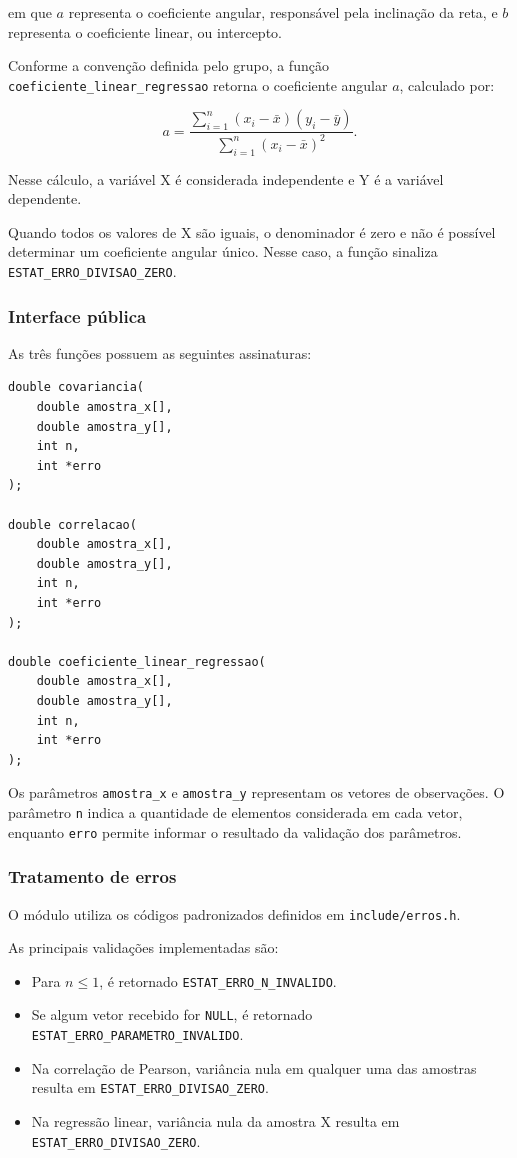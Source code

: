 \documentclass[12pt,a4paper]{article}
\newcommand{\cod}[1]{\texttt{#1}}
\begin{document}
em que $a$ representa o coeficiente angular, responsável pela inclinação
da reta, e $b$ representa o coeficiente linear, ou intercepto.

Conforme a convenção definida pelo grupo, a função
\cod{coeficiente\_linear\_regressao} retorna o coeficiente angular $a$,
calculado por:

\begin{equation}
a =
\frac{
\sum_{i=1}^{n}(x_i-\bar{x})(y_i-\bar{y})
}{
\sum_{i=1}^{n}(x_i-\bar{x})^2
}.
\end{equation}

Nesse cálculo, a variável X é considerada independente e Y é a
variável dependente.

Quando todos os valores de X são iguais, o denominador é zero e
não é possível determinar um coeficiente angular único. Nesse caso,
a função sinaliza \cod{ESTAT\_ERRO\_DIVISAO\_ZERO}.

\subsubsection{Interface pública}

As três funções possuem as seguintes assinaturas:

\begin{lstlisting}
double covariancia(
    double amostra_x[],
    double amostra_y[],
    int n,
    int *erro
);

double correlacao(
    double amostra_x[],
    double amostra_y[],
    int n,
    int *erro
);

double coeficiente_linear_regressao(
    double amostra_x[],
    double amostra_y[],
    int n,
    int *erro
);
\end{lstlisting}

Os parâmetros \cod{amostra\_x} e \cod{amostra\_y} representam os
vetores de observações. O parâmetro \cod{n} indica a quantidade de
elementos considerada em cada vetor, enquanto \cod{erro} permite
informar o resultado da validação dos parâmetros.

\subsubsection{Tratamento de erros}

O módulo utiliza os códigos padronizados definidos em
\cod{include/erros.h}.

As principais validações implementadas são:

\begin{itemize}
    \item Para $n \leq 1$, é retornado
    \cod{ESTAT\_ERRO\_N\_INVALIDO}.

    \item Se algum vetor recebido for \cod{NULL}, é retornado
    \cod{ESTAT\_ERRO\_PARAMETRO\_INVALIDO}.

    \item Na correlação de Pearson, variância nula em qualquer
    uma das amostras resulta em
    \cod{ESTAT\_ERRO\_DIVISAO\_ZERO}.

    \item Na regressão linear, variância nula da amostra X resulta
    em \cod{ESTAT\_ERRO\_DIVISAO\_ZERO}.
\end{itemize}
\end{document}
